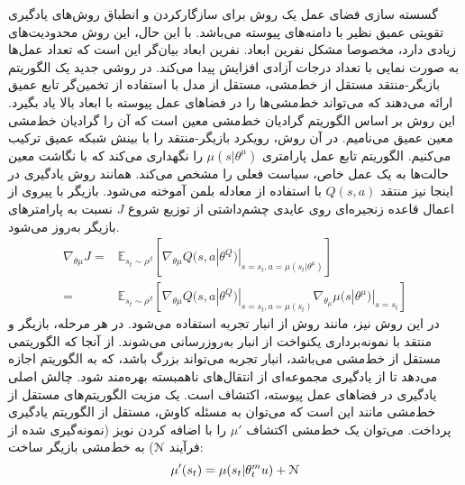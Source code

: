 گسسته سازی فضای عمل یک روش برای سازگار‌کردن و انطباق روش‌های یادگیری تقویتی عمیق نظیر 
با دامنه‌های پیوسته می‌باشد. با این حال، این روش محدودیت‌های زیادی دارد، مخصوصا مشکل نفرین ابعاد. نفرین ابعاد بیان‌گر این است که تعداد عمل‌ها به صورت نمایی با تعداد درجات آزادی افزایش پیدا می‌کند. 
در روشی جدید یک الگوریتم بازیگر-منتقد مستقل از خط‌مشی، مستقل از مدل
با استفاده از تخمین‌گر تابع عمیق ارائه می‌دهند که می‌تواند خط‌مشی‌ها را در فضاهای عمل پیوسته با ابعاد بالا یاد بگیرد.
این روش بر اساس الگوریتم گرادیان خط‌مشی معین
است که آن را گرادیان خط‌مشی معین عمیق
می‌نامیم. 
در آن روش، رویکرد بازیگر-منتقد را با بینش شبکه  عمیق
ترکیب می‌کنیم.
الگوریتم 
تابع عمل پارامتری
$
\mu (s|\theta^\mu)	
$
را نگهداری می‌کند که با نگاشت معین حالت‌ها به یک عمل خاص، سیاست فعلی را مشخص می‌کند.
همانند روش یادگیری 
در اینجا نیز منتقد
$Q(s,a)$
با استفاده از معادله بلمن آموخته می‌شود.
بازیگر با پیروی از اعمال قاعده زنجیره‌ای روی عایدی چشم‌داشتی از توزیع شروع
$J$
نسبت به پارامترهای بازیگر به‌روز می‌شود.
\begin{align}
	\nabla_{\theta \mu} J = & \mathbb{E}_{s_t \sim \rho ^{ \beta}} [ \nabla_{\theta \mu} Q(s,a|\theta^Q)|_{s=s_t,a=\mu (s_t|\theta^{\mu})}  ] \\ \nonumber
	= & \mathbb{E}_{s_t \sim \rho ^{ \beta}} [ \nabla_{\theta \mu} Q(s,a|\theta^Q)|_{s=s_t, a=\mu (s_t)} \nabla_{\theta_{\mu}} \mu (s|\theta^{\mu})|_{s=s_t} ]
\end{align}
در این روش نیز، مانند روش 
از انبار تجربه استفاده می‌شود. 
در هر مرحله، بازیگر و منتقد با نمونه‌برداری یکنواخت از انبار به‌روزرسانی می‌شوند. از آنجا که 
الگوریتمی مستقل از خط‌مشی می‌باشد، انبار تجربه می‌تواند بزرگ باشد، که به الگوریتم اجازه می‌دهد تا از یادگیری مجموعه‌ای از انتقال‌های ناهمبسته بهره‌مند شود.
چالش اصلی یادگیری در فضاهای عمل پیوسته، اکتشاف است. یک مزیت  الگوریتم‌های مستقل از خط‌مشی مانند 
این است که می‌توان به مسئله کاوش، مستقل از الگوریتم یادگیری پرداخت.
می‌توان یک خط‌مشی اکتشاف 
$\mu'$
را با اضافه کردن نویز (نمونه‌گیری شده از فرآیند $\EuScript{N}$) به خط‌مشی بازیگر ساخت:
\begin{equation}
\mu'(s_t) = \mu(s_t|\theta_t^mu) + \EuScript{N}
\end{equation}
